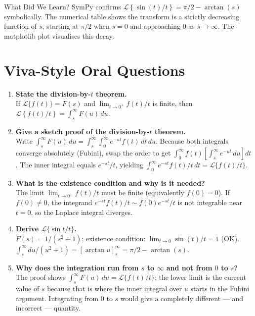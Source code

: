 \documentclass[12pt,a4paper]{article}
\begin{document}
\begin{learnbox}{What Did We Learn?}
SymPy confirms $\mathcal{L}\!\left\{\sin(t)/t\right\} = \pi/2 - \arctan(s)$
symbolically. The numerical table shows the transform is a strictly decreasing
function of $s$, starting at $\pi/2$ when $s=0$ and approaching $0$ as $s\to\infty$.
The matplotlib plot visualises this decay.
\end{learnbox}

\section{Viva-Style Oral Questions}

\begin{enumerate}[leftmargin=2em, label=\textbf{Q\arabic*.}]

\item \textbf{State the division-by-$t$ theorem.}\\
  If $\mathcal{L}\{f(t)\}=F(s)$ and $\lim_{t\to 0^+}f(t)/t$ is finite, then
  $\mathcal{L}\!\left\{f(t)/t\right\} = \int_s^\infty F(u)\,du$.

\item \textbf{Give a sketch proof of the division-by-$t$ theorem.}\\
  Write $\int_s^\infty F(u)\,du = \int_s^\infty\!\int_0^\infty e^{-ut}f(t)\,dt\,du$.
  Because both integrals converge absolutely (Fubini), swap the order to get
  $\int_0^\infty f(t)\left[\int_s^\infty e^{-ut}\,du\right]dt$.
  The inner integral equals $e^{-st}/t$, yielding
  $\int_0^\infty e^{-st}f(t)/t\,dt = \mathcal{L}\{f(t)/t\}$.

\item \textbf{What is the existence condition and why is it needed?}\\
  The limit $\lim_{t\to 0^+}f(t)/t$ must be finite (equivalently $f(0)=0$).
  If $f(0)\neq 0$, the integrand $e^{-st}f(t)/t \sim f(0)e^{-st}/t$ is not
  integrable near $t=0$, so the Laplace integral diverges.

\item \textbf{Derive $\mathcal{L}\{\sin t/t\}$.}\\
  $F(s)=1/(s^2+1)$; existence condition: $\lim_{t\to 0}\sin(t)/t=1$ (OK).
  $\int_s^\infty du/(u^2+1) = [\arctan u]_s^\infty = \pi/2 - \arctan(s)$.

\item \textbf{Why does the integration run from $s$ to $\infty$ and not from $0$ to $s$?}\\
  The proof shows $\int_s^\infty F(u)\,du = \mathcal{L}\{f(t)/t\}$; the lower
  limit is the current value of $s$ because that is where the inner integral
  over $u$ starts in the Fubini argument. Integrating from $0$ to $s$ would
  give a completely different --- and incorrect --- quantity.


\end{enumerate}
\end{document}
